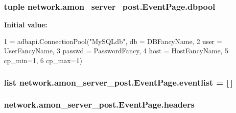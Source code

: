 \hypertarget{classnetwork_1_1amon__server__post_1_1_event_page_a27945808b5c4a8cdcde134a10df4965d}{
\subsubsection[{dbpool}]{\setlength{\rightskip}{0pt plus 5cm}tuple network.\-amon\-\_\-server\-\_\-post.\-Event\-Page.\-dbpool\hspace{0.3cm}{\ttfamily [static]}}}\label{classnetwork_1_1amon__server__post_1_1_event_page_a27945808b5c4a8cdcde134a10df4965d}
{\bfseries Initial value\-:}
\begin{DoxyCode}
1 = adbapi.ConnectionPool(\textcolor{stringliteral}{"MySQLdb"}, db = DBFancyName, 
2                                             user = UserFancyName, 
3                                             passwd = PasswordFancy, 
4                                             host = HostFancyName,
5                                             cp\_min=1,
6                                             cp\_max=1)
\end{DoxyCode}
\hypertarget{classnetwork_1_1amon__server__post_1_1_event_page_a758c79966f818aa356316d87052f9c2e}{
\subsubsection[{eventlist}]{\setlength{\rightskip}{0pt plus 5cm}list network.\-amon\-\_\-server\-\_\-post.\-Event\-Page.\-eventlist = \mbox{[}$\,$\mbox{]}\hspace{0.3cm}{\ttfamily [static]}}}\label{classnetwork_1_1amon__server__post_1_1_event_page_a758c79966f818aa356316d87052f9c2e}
\hypertarget{classnetwork_1_1amon__server__post_1_1_event_page_a032c0165742082f9d0e347cbdfb50711}{
\subsubsection[{headers}]{\setlength{\rightskip}{0pt plus 5cm}network.\-amon\-\_\-server\-\_\-post.\-Event\-Page.\-headers}}\label{classnetwork_1_1amon__server__post_1_1_event_page_a032c0165742082f9d0e347cbdfb50711}
